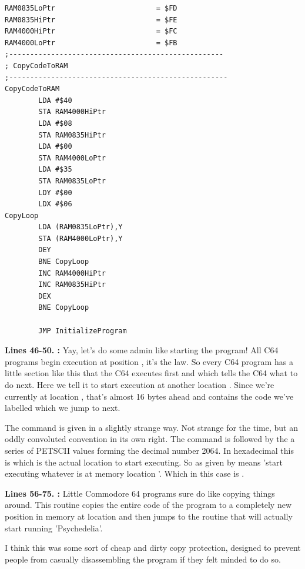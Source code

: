 \bigskip
\bigskip
\bigskip
\bigskip
\bigskip
\bigskip
\bigskip
\begin{lstlisting}[caption=Some strictly unnecessary code copying]
RAM0835LoPtr                        = $FD
RAM0835HiPtr                        = $FE
RAM4000HiPtr                        = $FC
RAM4000LoPtr                        = $FB
;---------------------------------------------------
; CopyCodeToRAM
;----------------------------------------------------
CopyCodeToRAM
        LDA #$40
        STA RAM4000HiPtr
        LDA #$08
        STA RAM0835HiPtr
        LDA #$00
        STA RAM4000LoPtr
        LDA #$35
        STA RAM0835LoPtr
        LDY #$00                                 
        LDX #$06
CopyLoop   
        LDA (RAM0835LoPtr),Y
        STA (RAM4000LoPtr),Y
        DEY 
        BNE CopyLoop
        INC RAM4000HiPtr
        INC RAM0835HiPtr
        DEX 
        BNE CopyLoop

        JMP InitializeProgram

\end{lstlisting}
\clearpage
\textbf{Lines 46-50. :} Yay, let's do some admin like starting the program! All C64 programs 
begin execution at position , it's the law.
So every C64 program has a little section like this that the C64 executes first and which tells the C64 what to do next.
Here we tell it to start execution at another location . Since we're currently at location , that's
almost 16 bytes ahead and contains the code we've labelled  which we jump to next.

The command is given in a slightly strange way. Not strange for the time, but an oddly convoluted convention in its own right.
The  command is followed by the a series of PETSCII values forming the decimal number 2064. In hexadecimal this is
 which is the actual location to start executing. So  as given by 
means 'start executing whatever is at memory location '. Which in this case is .

\bigskip
\bigskip
\textbf{Lines 56-75. :} Little Commodore 64 programs sure do like copying things around. This routine copies the entire code of the program to a
completely new position in memory at location  and then jumps to the routine  that will actually start running
'Psychedelia'.

I think this was some sort of cheap and dirty copy protection, designed to prevent people from casually disassembling the
program if they felt minded to do so. 

